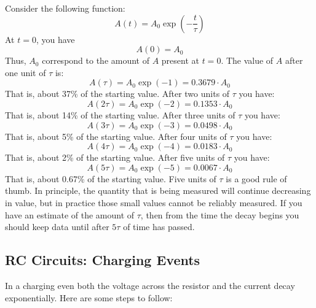 Consider the following function:
\begin{equation}
    A(t) = A_{0} \exp\left(- \frac{t}{\tau}\right)
\end{equation}
At $t = 0$, you have
\begin{equation}
    A(0) = A_{0}
\end{equation}
Thus, $A_{0}$ correspond to the amount of $A$ present at $t = 0$. The value of $A$ after one unit of $\tau$ is:
\begin{equation}
    A(\tau) = A_{0} \exp\left(-1\right) = 0.3679 \cdot A_{0}
\end{equation}
That is, about 37\% of the starting value. After two units of $\tau$ you have:
\begin{equation}
    A(2\tau) = A_{0} \exp\left(-2\right) = 0.1353 \cdot A_{0}
\end{equation}
That is, about 14\% of the starting value. After three units of $\tau$ you have:
\begin{equation}
    A(3\tau) = A_{0} \exp\left(-3\right) = 0.0498 \cdot A_{0}
\end{equation}
That is, about 5\% of the starting value. After four units of $\tau$ you have:
\begin{equation}
    A(4\tau) = A_{0} \exp\left(-4\right) = 0.0183 \cdot A_{0}
\end{equation}
That is, about 2\% of the starting value. After five units of $\tau$ you have:
\begin{equation}
    A(5\tau) = A_{0} \exp\left(-5\right) = 0.0067 \cdot A_{0}
\end{equation}
That is, about 0.67\% of the starting value. Five units of $\tau$ is a good rule of thumb. In principle, the quantity that is being measured will continue decreasing in value, but in practice those small values cannot be reliably measured. If you have an estimate of the amount of $\tau$, then from the time the decay begins you should keep data until after $5 \tau$ of time has passed.
\subsection{RC Circuits: Charging Events}
In a charging even both the voltage across the resistor and the current decay exponentially. Here are some steps to follow:
